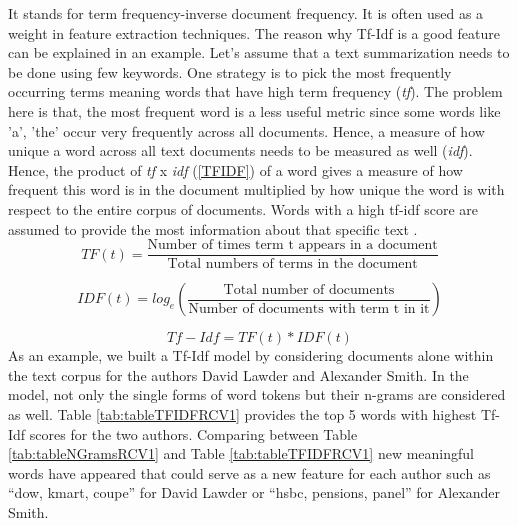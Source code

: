 It stands for term frequency-inverse document frequency. It is often used as a weight in feature extraction techniques. The reason why Tf-Idf is a good feature can be explained in an example. Let’s assume that a text summarization needs to be done using few keywords. One strategy is to pick the most frequently occurring
terms meaning words that have high term frequency (\textit{tf}). The problem here is that, the most frequent word is a less useful metric since some words like ’a’, ’the’ occur very frequently across all documents. Hence, a measure of how unique a word across all text documents needs to be measured as well (\textit{idf}). Hence, the product of \textit{tf} x \textit{idf} (\ref{TFIDF}) of a word gives a measure of how frequent this word is in the document multiplied by how unique the word is with respect to the entire corpus of documents. Words with a high tf-idf score are assumed to provide the most information about that specific text \cite{stamatatos2009survey}.
\begin{equation}\label{TF}
		TF(t) = \frac{\text{Number of times term t appears in a document}}{\text{Total numbers of terms in the document}}
\end{equation}

\begin{equation}\label{IDF}
	IDF(t) = log_e(\frac{\text{Total number of documents}}{\text{Number of documents with term t in it}}) 
\end{equation}

\begin{equation}\label{TFIDF}
	Tf - Idf = TF(t) * IDF(t)
\end{equation}
As an example, we built a Tf-Idf model by considering documents alone within the text corpus for the authors David Lawder and Alexander Smith.
In the model, not only the single forms of word tokens but their n-grams are considered as well. Table \ref{tab:tableTFIDFRCV1} provides the top 5 words with highest Tf-Idf scores for the two authors. Comparing between Table \ref{tab:tableNGramsRCV1} and Table \ref{tab:tableTFIDFRCV1} new meaningful words have appeared that could serve as a new feature for each author such as “dow, kmart, coupe” for David Lawder or “hsbc, pensions, panel” for Alexander Smith.

